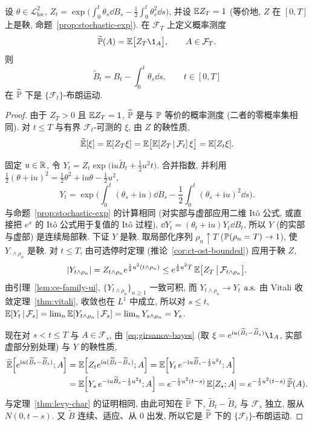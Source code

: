 \begin{theorem}[Girsanov 定理]\label{thm:girsanov}
设 $\theta\in\mathscr{L}^2_{\mathrm{loc}}$, $Z_t=\exp\big(\int_0^t\theta_s\dd B_s-\frac{1}{2}\int_0^t\theta_s^2\dd s\big)$, 并设 $\E Z_T=1$ (等价地, $Z$ 在 $[0,T]$ 上是鞅, 命题~\ref{prop:stochastic-exp}). 在 $\mathcal{F}_T$ 上定义概率测度
\[
\widetilde{\P}(A)=\E\big[Z_T\1_A\big],\qquad A\in\mathcal{F}_T.
\]
则
\[
\widetilde{B}_t=B_t-\int_0^t\theta_s\dd s,\qquad t\in[0,T]
\]
在 $\widetilde{\P}$ 下是 $\{\mathcal{F}_t\}$-布朗运动.
\end{theorem}

\begin{proof}
由于 $Z_T>0$ 且 $\E Z_T=1$, $\widetilde{\P}$ 是与 $\P$ 等价的概率测度 (二者的零概率集相同). 对 $t\le T$ 与有界 $\mathcal{F}_t$-可测的 $\xi$, 由 $Z$ 的鞅性质,
\begin{equation}\label{eq:girsanov-bayes}
\widetilde{\E}[\xi]=\E[Z_T\xi]=\E\big[\E[Z_T\,|\,\mathcal{F}_t]\,\xi\big]=\E[Z_t\xi].
\end{equation}

固定 $u\in\R$, 令 $Y_t=Z_t\exp\big(\mathrm{i}u\widetilde{B}_t+\frac{1}{2}u^2t\big)$. 合并指数, 并利用 $\frac{1}{2}(\theta+\mathrm{i}u)^2=\frac{1}{2}\theta^2+\mathrm{i}u\theta-\frac{1}{2}u^2$,
\[
Y_t=\exp\Big(\int_0^t(\theta_s+\mathrm{i}u)\dd B_s-\frac{1}{2}\int_0^t(\theta_s+\mathrm{i}u)^2\dd s\Big).
\]
与命题~\ref{prop:stochastic-exp} 的计算相同 (对实部与虚部应用二维 It\^o 公式, 或直接把 $e^x$ 的 It\^o 公式用于复值的 It\^o 过程), $\dd Y_t=(\theta_t+\mathrm{i}u)Y_t\dd B_t$, 所以 $Y$ (的实部与虚部) 是连续局部鞅. 下证 $Y$ 是鞅. 取局部化序列 $\rho_n\uparrow T$ ($\P(\rho_n=T)\to1$), 使 $Y_{\cdot\wedge\rho_n}$ 是鞅. 对 $t\le T$, 由可选停时定理 (推论~\ref{cor:ct-ost-bounded}) 应用于鞅 $Z$,
\[
\abs{Y_{t\wedge\rho_n}}=Z_{t\wedge\rho_n}e^{\frac{1}{2}u^2(t\wedge\rho_n)}\le e^{\frac{1}{2}u^2T}\,\E\big[Z_T\,\big|\,\mathcal{F}_{t\wedge\rho_n}\big].
\]
由引理~\ref{lem:ce-family-ui}, $\{Y_{t\wedge\rho_n}\}_{n\ge1}$ 一致可积, 而 $Y_{t\wedge\rho_n}\to Y_t$ $\as$ 由 Vitali 收敛定理~\ref{thm:vitali}, 收敛也在 $L^1$ 中成立, 所以对 $s\le t$, $\E[Y_t\,|\,\mathcal{F}_s]=\lim_n\E[Y_{t\wedge\rho_n}\,|\,\mathcal{F}_s]=\lim_nY_{s\wedge\rho_n}=Y_s$.

现在对 $s<t\le T$ 与 $A\in\mathcal{F}_s$, 由 \eqref{eq:girsanov-bayes} (取 $\xi=e^{\mathrm{i}u(\widetilde{B}_t-\widetilde{B}_s)}\1_A$, 实部虚部分别处理) 与 $Y$ 的鞅性质,
\begin{align*}
\widetilde{\E}\Big[e^{\mathrm{i}u(\widetilde{B}_t-\widetilde{B}_s)};A\Big]&=\E\Big[Z_te^{\mathrm{i}u(\widetilde{B}_t-\widetilde{B}_s)};A\Big]=\E\Big[Y_t\,e^{-\mathrm{i}u\widetilde{B}_s-\frac{1}{2}u^2t};A\Big]\\
&=\E\Big[Y_s\,e^{-\mathrm{i}u\widetilde{B}_s-\frac{1}{2}u^2t};A\Big]=e^{-\frac{1}{2}u^2(t-s)}\,\E[Z_s;A]=e^{-\frac{1}{2}u^2(t-s)}\,\widetilde{\P}(A).
\end{align*}
与定理~\ref{thm:levy-char} 的证明相同, 由此可知在 $\widetilde{\P}$ 下, $\widetilde{B}_t-\widetilde{B}_s$ 与 $\mathcal{F}_s$ 独立, 服从 $N(0,t-s)$. 又 $\widetilde{B}$ 连续、适应、从 $0$ 出发, 所以它是 $\widetilde{\P}$ 下的 $\{\mathcal{F}_t\}$-布朗运动.
\end{proof}

